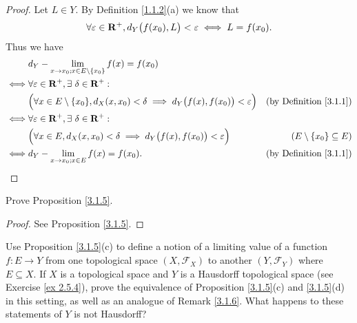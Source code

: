 \begin{proof}
    Let \(L \in Y\).
    By Definition \ref{1.1.2}(a) we know that
    \[
        \forall \varepsilon \in \mathbf{R}^+, d_Y\big(f(x_0), L\big) < \varepsilon \iff L = f(x_0).
    \]
    Thus we have
    \begin{align*}
             & d_Y - \lim_{x \to x_0 ; x \in E \setminus \{x_0\}} f(x) = f(x_0)                                                                                        \\
        \iff & \forall \varepsilon \in \mathbf{R}^+, \exists\ \delta \in \mathbf{R}^+ :                                                                                                \\
             & \Big(\forall x \in E \setminus \{x_0\}, d_X(x, x_0) < \delta \implies d_Y\big(f(x), f(x_0)\big) < \varepsilon\Big) & \text{(by Definition \ref{3.1.1})} \\
        \iff & \forall \varepsilon \in \mathbf{R}^+, \exists\ \delta \in \mathbf{R}^+ :                                                                                                \\
             & \Big(\forall x \in E, d_X(x, x_0) < \delta \implies d_Y\big(f(x), f(x_0)\big) < \varepsilon\Big)                   & (E \setminus \{x_0\} \subseteq E)  \\
        \iff & d_Y - \lim_{x \to x_0 ; x \in E} f(x) = f(x_0).                                                                    & \text{(by Definition \ref{3.1.1})}
    \end{align*}
\end{proof}

\begin{exercise}\label{ex 3.1.2}
    Prove Proposition \ref{3.1.5}.
\end{exercise}

\begin{proof}
    See Proposition \ref{3.1.5}.
\end{proof}

\begin{exercise}\label{ex 3.1.3}
    Use Proposition \ref{3.1.5}(c) to define a notion of a limiting value of a function \(f : E \to Y\) from one topological space \((X, \mathcal{F}_X)\) to another \((Y, \mathcal{F}_Y)\) where \(E \subseteq X\).
    If \(X\) is a topological space and \(Y\) is a Hausdorff topological space (see Exercise \ref{ex 2.5.4}), prove the equivalence of Proposition \ref{3.1.5}(c) and \ref{3.1.5}(d) in this setting, as well as an analogue of Remark \ref{3.1.6}.
    What happens to these statements of \(Y\) is not Hausdorff?
\end{exercise}

